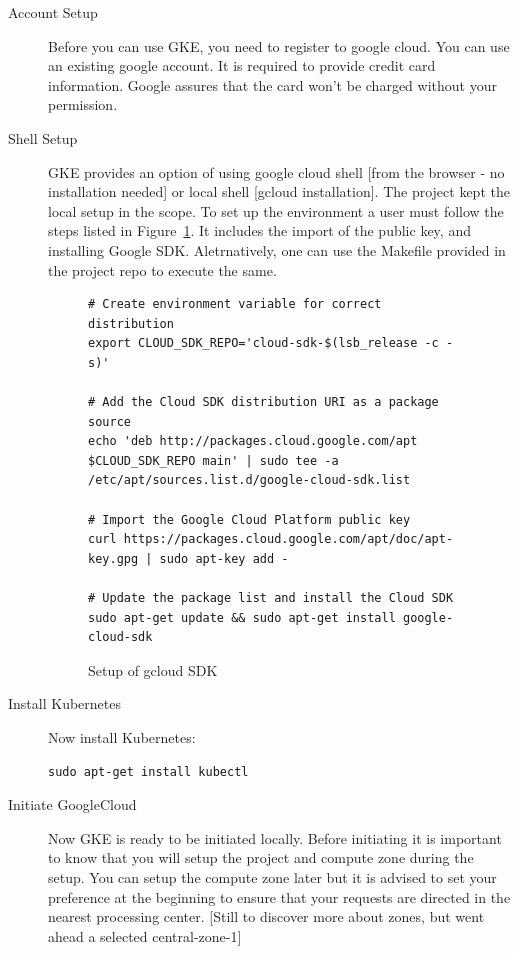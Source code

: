 \begin{description}

\item[Account Setup] Before you can use GKE, you need to register to google
  cloud. You can use an existing google account. It is required to provide
  credit card information.  Google assures that the card won't be charged
  without your permission.

\item[Shell Setup] GKE provides an option of using google cloud shell [from
  the browser - no installation needed] or local shell [gcloud installation].
  The project kept the local setup in the scope. To set up the environment a
  user must follow the steps listed in Figure~\ref{F:setup}. It includes the
  import of the public key, and installing Google SDK. Aletrnatively, one can
  use the Makefile provided in the project repo to execute the same.

\begin{figure}[htb]
\begin{footnotesize}
\begin{verbatim}
# Create environment variable for correct distribution
export CLOUD_SDK_REPO='cloud-sdk-$(lsb_release -c -s)'

# Add the Cloud SDK distribution URI as a package source
echo 'deb http://packages.cloud.google.com/apt $CLOUD_SDK_REPO main' | sudo tee -a /etc/apt/sources.list.d/google-cloud-sdk.list

# Import the Google Cloud Platform public key
curl https://packages.cloud.google.com/apt/doc/apt-key.gpg | sudo apt-key add -

# Update the package list and install the Cloud SDK
sudo apt-get update && sudo apt-get install google-cloud-sdk
\end{verbatim}

\end{footnotesize}
\caption{Setup of gcloud SDK}\label{F:setup}
\end{figure}


\item[Install Kubernetes] Now install Kubernetes:

\begin{verbatim}
sudo apt-get install kubectl
\end{verbatim}

\item[Initiate GoogleCloud] Now GKE is ready to be initiated locally. Before
initiating it is important to know that you will setup the project and compute
zone during the setup. You can setup the compute zone later but it is advised
to set your preference at the beginning to ensure that your requests are
directed in the nearest processing center. [Still to discover more about
zones, but went ahead a selected central-zone-1] 


\end{description}
